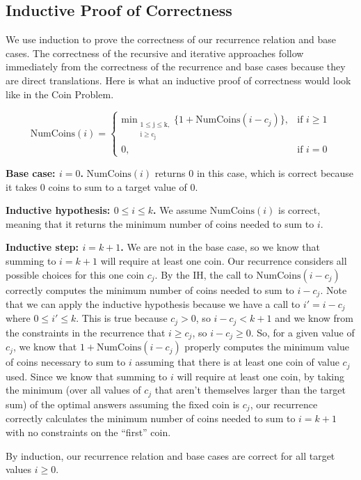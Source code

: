 \documentclass[11pt]{article}
\begin{document}
\subsection{Inductive Proof of Correctness}
\label{sec:correctness}
We use induction to prove the correctness of our recurrence relation and base cases. The correctness of the recursive and iterative approaches follow immediately from the correctness of the recurrence and base cases because they are direct translations. Here is what an inductive proof of correctness would look like in the Coin Problem.

\[
    \mathrm{NumCoins}(i) = 
\begin{cases}
    \mathrm{min_\substack{1 \leq j \leq k, \\ i \geq c_j}}\{ 1+ \mathrm{NumCoins}(i - c_j) \},& \text{if } i\geq 1\\
    0,              & \text{if } i=0
\end{cases}
\]

\textbf{Base case: $i = 0$.} $\mathrm{NumCoins}(i)$ returns 0 in this case, which is correct because it takes 0 coins to sum to a target value of 0.

\textbf{Inductive hypothesis: $0 \leq i \leq k$.} We assume $\mathrm{NumCoins}(i)$ is correct, meaning that it returns the minimum number of coins needed to sum to $i$.

\textbf{Inductive step: $i = k + 1$.} We are not in the base case, so we know that summing to $i = k+1$ will require at least one coin. Our recurrence considers all possible choices for this one coin $c_j$. By the IH, the call to $\mathrm{NumCoins}(i - c_j)$ correctly computes the minimum number of coins needed to sum to $i - c_j$. Note that we can apply the inductive hypothesis because we have a call to $i' = i - c_j$ where $0 \leq i' \leq k$. This is true because $c_j > 0$, so $i - c_j < k+1 $ and we know from the constraints in the recurrence that $i \geq c_j$, so $i - c_j \geq 0$. So, for a given value of $c_j$, we know that $1+ \mathrm{NumCoins}(i - c_j)$ properly computes the minimum value of coins necessary to sum to $i$ assuming that there is at least one coin of value $c_j$ used. Since we know that summing to $i$ will require at least one coin, by taking the minimum (over all values of $c_j$ that aren't themselves larger than the target sum) of the optimal answers assuming the fixed coin is $c_j$, our recurrence correctly calculates the minimum number of coins needed to sum to $i = k+1$ with no constraints on the ``first'' coin.

By induction, our recurrence relation and base cases are correct for all target values $i \geq 0$.
\end{document}
